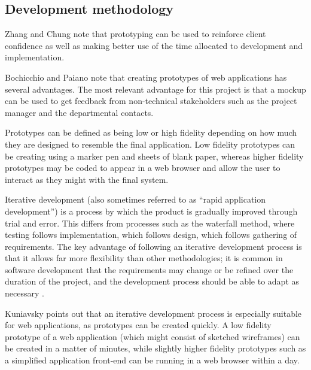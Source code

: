 \documentclass[draft]{scrartcl}
\begin{document}






\subsection{Development methodology}


Zhang and Chung \cite{MODFM_2003} note that prototyping can be used to
reinforce client confidence as well as making better use of the time allocated
to development and implementation.

Bochicchio and Paiano \cite{PrototypingWebApplications_2000} note that
creating prototypes of web applications has several advantages.
The most relevant advantage for this project is that a mockup can be used to
get feedback from non-technical stakeholders such as the project manager and
the departmental contacts.

Prototypes can be defined as being low or high fidelity depending on how much
they are designed to resemble the final application. Low fidelity prototypes
can be creating using a marker pen and sheets of blank paper, whereas higher
fidelity prototypes may be coded to appear in a web browser and allow the user
to interact as they might with the final system.


Iterative development (also sometimes referred to as ``rapid application
development'') is a process by which the product is gradually improved through
trial and error. This differs from processes such as the waterfall method,
where testing follows implementation, which follows design, which follows
gathering of requirements. The key advantage of following an iterative
development process is that it allows far more flexibility than other
methodologies; it is common in software development that the requirements may
change or be refined over the duration of the project, and the development
process should be able to adapt as necessary \cite{kuniavsky2003userexperience}.

Kuniavsky points out that an iterative development process is especially
suitable for web applications, as prototypes can be created quickly. A low
fidelity prototype of a web application (which might consist of sketched
wireframes) can be created in a matter of minutes, while slightly higher
fidelity prototypes such as a simplified application front-end can be running
in a web browser within a day.
\end{document}
